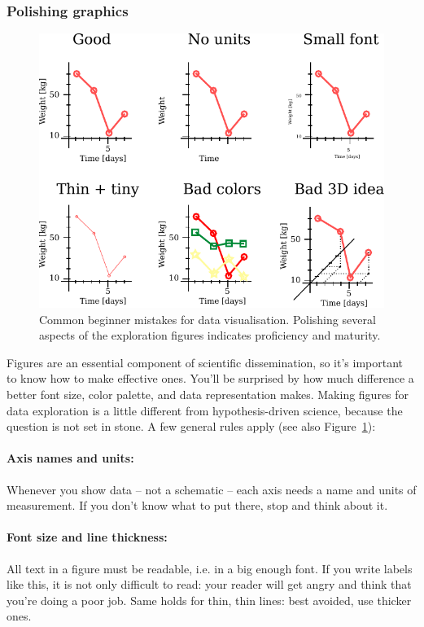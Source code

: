 \documentclass[12pt,a4paper,notitlepage,onecolumn]{article}
\begin{document}
\subsubsection{Polishing graphics}
\begin{figure}
\begin{center}
\includegraphics[width=0.81\linewidth]{visualisations2.pdf}
\caption{Common beginner mistakes for data visualisation. Polishing several aspects of the exploration figures indicates proficiency and maturity.}
\label{fig:viz2}
\end{center}
\end{figure}
Figures are an essential component of scientific dissemination, so it's important to know how to make effective ones. You'll be surprised by how much difference a better font size, color palette, and data representation makes. Making figures for data exploration is a little different from hypothesis-driven science, because the question is not set in stone. A few general rules apply (see also Figure~\ref{fig:viz2}):

\paragraph{Axis names and units:} Whenever you show data -- not a schematic -- each axis needs a name and units of measurement. If you don't know what to put there, stop and think about it.

\paragraph{Font size and line thickness:} All text in a figure must be readable, i.e. in a big enough font. If you write labels {\tiny like this}, it is not only difficult to read: your reader will get angry and think that you're doing a poor job. Same holds for thin, thin lines: best avoided, use thicker ones.
\end{document}

